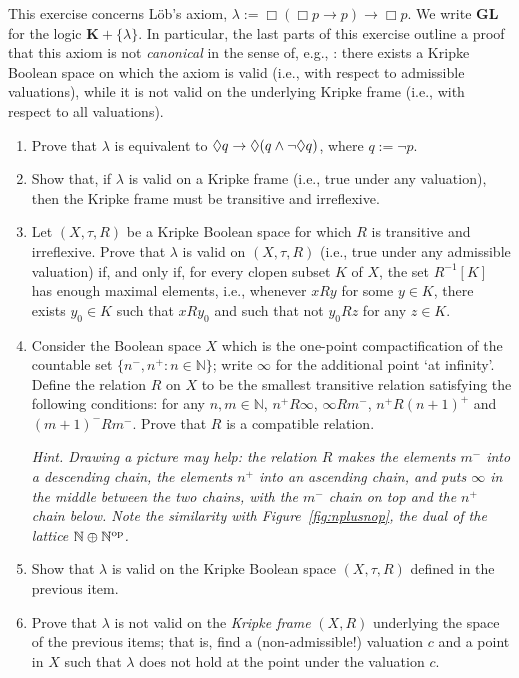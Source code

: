 \begin{exercise}\label{exe:GL}
This exercise concerns Löb's axiom, $\lambda := \Box (\Box p \to p) \to \Box p$. We write $\mathbf{GL}$ for the logic $\mathbf{K} + \{\lambda\}$. In particular, the last parts of this exercise outline a proof that this axiom is not \emph{canonical} in the sense of, e.g., \cite[Def.~4.30]{BRV2001}: there exists a Kripke Boolean space on which the axiom is valid (i.e., with respect to admissible valuations), while it is not valid on the underlying Kripke frame (i.e., with respect to all valuations).
\begin{enumerate}
  \item Prove that $\lambda$ is equivalent to $\Diamond q \to \Diamond(q \wedge \neg \Diamond q)$, where $q := \neg p$.
  \item Show that, if $\lambda$ is valid on a Kripke frame (i.e., true under any valuation), then the Kripke frame must be transitive and irreflexive.
  \item Let $(X, \tau, R)$ be a Kripke Boolean space for which $R$ is transitive and irreflexive. Prove that $\lambda$ is valid on $(X, \tau, R)$ (i.e., true under any admissible valuation) if, and only if, for every clopen subset $K$ of $X$, the set $R^{-1}[K]$ has enough maximal elements, i.e., whenever $x R y$ for some $y \in K$, there exists $y_0 \in K$ such that $x R y_0$ and such that not $y_0 R z$ for any $z \in K$.
  \item Consider the Boolean space $X$ which is the one-point compactification of the countable set $\{n^-, n^+ : n \in \mathbb{N}\}$; write $\infty$ for the additional point `at infinity'. Define the relation $R$ on $X$ to be the smallest transitive relation satisfying the following conditions: for any $n, m \in \mathbb{N}$, $n^+ R \infty$, $\infty R m^-$, $n^+ R (n + 1)^+$ and $(m + 1)^- R m^-$. Prove that $R$ is a compatible relation.
  
  {\it Hint. Drawing a picture may help: the relation $R$ makes the elements $m^-$ into a descending chain, the elements $n^+$ into an ascending chain, and puts $\infty$ in the middle between the two chains, with the $m^-$ chain on top and the $n^+$ chain below. Note the similarity with Figure~\ref{fig:nplusnop}, the dual of the lattice $\mathbb{N} \oplus \mathbb{N}^{\mathrm{op}}$.}
  \item Show that $\lambda$ is valid on the Kripke Boolean space $(X, \tau, R)$ defined in the previous item.
  \item Prove that $\lambda$ is not valid on the \emph{Kripke frame} $(X,R)$ underlying the space of the previous items; that is, find a (non-admissible!) valuation $c$ and a point in $X$ such that $\lambda$ does not hold at the point under the valuation $c$.
\end{enumerate}
\end{exercise}

